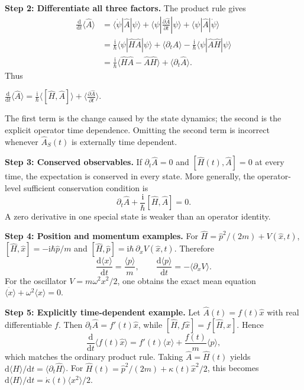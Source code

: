 \documentclass[11pt,a4paper]{article}
\newcommand{\key}[1]{\begin{resultbox}\centering\(\displaystyle #1\)\end{resultbox}}
\newcommand{\dd}{\mathrm{d}}\newcommand{\iu}{\mathrm{i}}\newcommand{\ee}{\mathrm{e}}
\newcommand{\avg}[1]{\langle #1\rangle}\newcommand{\Sch}{Schr\"odinger}
\newcommand{\bra}[1]{\langle #1|}\newcommand{\ket}[1]{|#1\rangle}
\begin{document}
\textbf{Step 2: Differentiate all three factors.} The product rule gives
\begin{align}
\frac{\dd}{\dd t}\avg{\hat A}&=\bra{\dot\psi}\hat A\ket\psi+\bra\psi\frac{\partial\hat A}{\partial t}\ket\psi+\bra\psi\hat A\ket{\dot\psi}\\
&=\frac{\iu}{\hbar}\bra\psi\hat H\hat A\ket\psi+\avg{\partial_t\hat A}-\frac{\iu}{\hbar}\bra\psi\hat A\hat H\ket\psi\\
&=\frac{\iu}{\hbar}\avg{\hat H\hat A-\hat A\hat H}+\avg{\partial_t\hat A}.
\end{align}
Thus
\key{\boxed{\frac{\dd}{\dd t}\avg{\hat A}=\frac{\iu}{\hbar}\avg{[\hat H,\hat A]}+\avg{\frac{\partial\hat A}{\partial t}}.}}
The first term is the change caused by the state dynamics; the second is the explicit operator time dependence. Omitting the second term is incorrect whenever \(\hat A_S(t)\) is externally time dependent.

\textbf{Step 3: Conserved observables.} If \(\partial_t\hat A=0\) and \([\hat H(t),\hat A]=0\) at every time, the expectation is conserved in every state. More generally, the operator-level sufficient conservation condition is
\begin{equation}\boxed{\partial_t\hat A+\frac{\iu}{\hbar}[\hat H,\hat A]=0.}\end{equation}
A zero derivative in one special state is weaker than an operator identity.

\textbf{Step 4: Position and momentum examples.} For \(\hat H=\hat p^2/(2m)+V(\hat x,t)\), \([\hat H,\hat x]=-\iu\hbar\hat p/m\) and \([\hat H,\hat p]=\iu\hbar\,\partial_xV(\hat x,t)\). Therefore
\begin{equation}\boxed{\frac{\dd\avg x}{\dd t}=\frac{\avg p}{m},\qquad\frac{\dd\avg p}{\dd t}=-\avg{\partial_xV}.}\end{equation}
For the oscillator \(V=m\omega^2x^2/2\), one obtains the exact mean equation \(\ddot{\avg x}+\omega^2\avg x=0\).

\textbf{Step 5: Explicitly time-dependent example.} Let \(\hat A(t)=f(t)\hat x\) with real differentiable \(f\). Then \(\partial_t\hat A=f'(t)\hat x\), while \([\hat H,f\hat x]=f[\hat H,\hat x]\). Hence
\begin{equation}\boxed{\frac{\dd}{\dd t}\avg{f(t)\hat x}=f'(t)\avg x+\frac{f(t)}m\avg p,}\end{equation}
which matches the ordinary product rule. Taking \(\hat A=\hat H(t)\) yields \(\dd\avg H/\dd t=\avg{\partial_t\hat H}\). For \(\hat H(t)=\hat p^2/(2m)+\kappa(t)\hat x^2/2\), this becomes \(\dd\avg H/\dd t=\dot\kappa(t)\avg{x^2}/2\).
\end{document}
